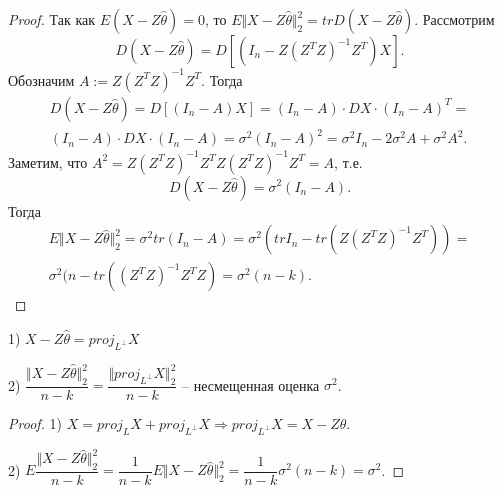 \begin{proof}
    Так как $\displaystyle E( X-Z\hat{\theta }) =0$, то $\displaystyle E\Vert X-Z\hat{\theta }\Vert _{2}^{2} =trD( X-Z\hat{\theta })$. Рассмотрим
    \begin{equation*}
        D( X-Z\hat{\theta }) =D\left[\left( I_{n} -Z\left( Z^{T} Z\right)^{-1} Z^{T}\right) X\right] .
    \end{equation*}
    Обозначим $\displaystyle A:=Z\left( Z^{T} Z\right)^{-1} Z^{T}$. Тогда
    \begin{gather*}
        D( X-Z\hat{\theta }) =D[( I_{n} -A) X] =( I_{n} -A) \cdotp DX\cdotp ( I_{n} -A)^{T} =\\
        ( I_{n} -A) \cdotp DX\cdotp ( I_{n} -A) =\sigma ^{2}( I_{n} -A)^{2} =\sigma ^{2} I_{n} -2\sigma ^{2} A+\sigma ^{2} A^{2} .
    \end{gather*}
    Заметим, что $\displaystyle A^{2} =Z\left( Z^{T} Z\right)^{-1} Z^{T} Z\left( Z^{T} Z\right)^{-1} Z^{T} =A$, т.е.
    \begin{equation*}
        D( X-Z\hat{\theta }) =\sigma ^{2}( I_{n} -A) .
    \end{equation*}
    Тогда
    \begin{gather*}
        E\Vert X-Z\hat{\theta }\Vert _{2}^{2} =\sigma ^{2} tr( I_{n} -A) =\sigma ^{2}\left( trI_{n} -tr\left( Z\left( Z^{T} Z\right)^{-1} Z^{T}\right)\right) =\\
        \sigma ^{2}( n-tr\left(\left( Z^{T} Z\right)^{-1} Z^{T} Z\right) =\sigma ^{2}( n-k) .
    \end{gather*}
\end{proof}
\begin{corollary}
    1) $\displaystyle X-Z\hat{\theta } =proj_{L^{\perp }} X$
    
    2) $\displaystyle \dfrac{\Vert X-Z\hat{\theta }\Vert _{2}^{2}}{n-k} =\dfrac{\Vert proj_{L^{\perp }} X\Vert _{2}^{2}}{n-k}$ -- несмещенная оценка $\displaystyle \sigma ^{2}$.
\end{corollary}
\begin{proof}
    1) $\displaystyle X=proj_{L} X+proj_{L^{\perp }} X\Rightarrow proj_{L^{\perp }} X=X-Z\hat{\theta }$.
    
    2) $\displaystyle E\dfrac{\Vert X-Z\hat{\theta }\Vert _{2}^{2}}{n-k} =\dfrac{1}{n-k} E\Vert X-Z\hat{\theta }\Vert _{2}^{2} =\dfrac{1}{n-k} \sigma ^{2}( n-k) =\sigma ^{2}$.
\end{proof}
